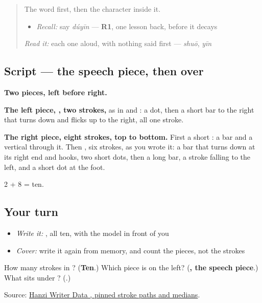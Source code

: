 \begin{quote}
The word first, then the character inside it.

\begin{itemize}
\raggedright
  \item \emph{Recall:} say \emph{dúyīn} — \textbf{R1}, one lesson back, before it decays
\end{itemize}

\begin{quote}
 
\end{quote}

\emph{Read it:} each one aloud, with nothing said first — \emph{shuō}, \emph{yīn}
\end{quote}

\subsection*{Script — the speech piece, then  over }

\begin{quote}
\end{quote}

\textbf{Two pieces, left before right.}

\textbf{The left piece, , two strokes,} as in  and : a dot, then a short bar to the right that turns down and flicks up to the right, all one stroke.

\textbf{The right piece, eight strokes, top to bottom.} First a short : a bar and a vertical through it. Then , six strokes, as you wrote it: a bar that turns down at its right end and hooks, two short dots, then a long bar, a stroke falling to the left, and a short dot at the foot.

2 + 8 = ten.

\subsection*{Your turn}
\begin{itemize}
\raggedright
  \item \emph{Write it:} , all ten, with the model in front of you
  \item \emph{Cover:} write it again from memory, and count the pieces, not the strokes
\end{itemize}

\begin{tcolorbox}[breakable,colback=teal!4,colframe=teal!35!black,title={Before you move on}]
How many strokes in ? (\textbf{Ten}.) Which piece is on the left? (\textbf{, the speech piece}.) What sits under ? (\textbf{}.)

Source: \href{https://raw.githubusercontent.com/chanind/hanzi-writer-data/68d10a4b21150cae5e1ebbd223eed289cf32d90c/data/\%E8\%AF\%BB.json}{Hanzi Writer Data , pinned stroke paths and medians}.
\end{tcolorbox}
